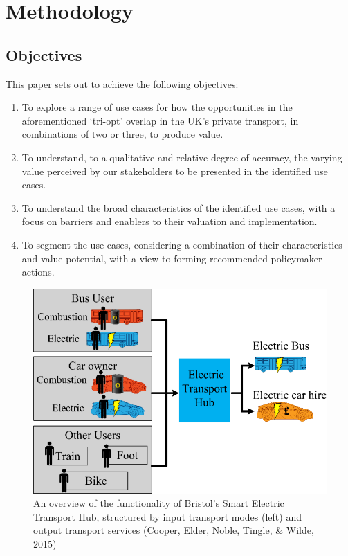 \documentclass[journal]{IEEEtran}
\begin{document}
\section{Methodology}\label{methodology}

\subsection{Objectives}

This paper sets out to achieve the following objectives:

\begin{enumerate}
\item To explore a range of use cases for how the opportunities in the
  aforementioned `tri-opt' overlap in the UK's private transport, in
  combinations of two or three, to produce value.  
\item To understand, to a qualitative and relative degree of accuracy,
  the varying value perceived by our stakeholders to be presented in
  the identified use cases. 
\item To understand the broad characteristics of the identified use
  cases, with a focus on barriers and enablers to their valuation and
  implementation.
\item To segment the use cases, considering a combination of their
  characteristics and value potential, with a view to forming
  recommended policymaker actions.
\end{enumerate}

\begin{figure}[!htp]
\centering
\includegraphics[width=\columnwidth]{images/bristolhub.png}
\caption{An overview of the functionality of Bristol's Smart Electric
  Transport Hub, structured by input transport modes (left) and output
  transport services (Cooper, Elder, Noble, Tingle, \& Wilde,
  2015)}
\label{fig:bristolhub}
\end{figure}
\end{document}
